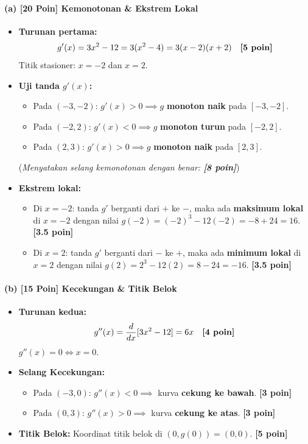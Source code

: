 \documentclass[11pt,a4paper]{article}
\begin{document}
\paragraph{(a) [20 Poin] Kemonotonan \& Ekstrem Lokal}
\begin{itemize}[leftmargin=18pt]
    \item \textbf{Turunan pertama:}
    \[
    g'(x) = 3x^2 - 12 = 3(x^2 - 4) = 3(x-2)(x+2) \quad \text{\textbf{[5 poin]}}
    \]
    Titik stasioner: $x = -2$ dan $x = 2$.
    \item \textbf{Uji tanda $g'(x)$:}
    \begin{itemize}
        \item Pada $(-3, -2)$: $g'(x) > 0 \implies g$ \textbf{monoton naik} pada $[-3, -2]$.
        \item Pada $(-2, 2)$: $g'(x) < 0 \implies g$ \textbf{monoton turun} pada $[-2, 2]$.
        \item Pada $(2, 3)$: $g'(x) > 0 \implies g$ \textbf{monoton naik} pada $[2, 3]$.
    \end{itemize}
    (\textit{Menyatakan selang kemonotonan dengan benar: \textbf{[8 poin]}})
    \item \textbf{Ekstrem lokal:}
    \begin{itemize}
        \item Di $x = -2$: tanda $g'$ berganti dari $+$ ke $-$, maka ada \textbf{maksimum lokal} di $x = -2$ dengan nilai $g(-2) = (-2)^3 - 12(-2) = -8 + 24 = 16$. \textbf{[3.5 poin]}
        \item Di $x = 2$: tanda $g'$ berganti dari $-$ ke $+$, maka ada \textbf{minimum lokal} di $x = 2$ dengan nilai $g(2) = 2^3 - 12(2) = 8 - 24 = -16$. \textbf{[3.5 poin]}
    \end{itemize}
\end{itemize}

\paragraph{(b) [15 Poin] Kecekungan \& Titik Belok}
\begin{itemize}[leftmargin=18pt]
    \item \textbf{Turunan kedua:}
    \[
    g''(x) = \frac{d}{dx}[3x^2 - 12] = 6x \quad \text{\textbf{[4 poin]}}
    \]
    $g''(x) = 0 \iff x = 0$.
    \item \textbf{Selang Kecekungan:}
    \begin{itemize}
        \item Pada $(-3, 0)$: $g''(x) < 0 \implies$ kurva \textbf{cekung ke bawah}. \textbf{[3 poin]}
        \item Pada $(0, 3)$: $g''(x) > 0 \implies$ kurva \textbf{cekung ke atas}. \textbf{[3 poin]}
    \end{itemize}
    \item \textbf{Titik Belok:}
    Koordinat titik belok di $(0, g(0)) = (0, 0)$. \textbf{[5 poin]}
\end{itemize}
\end{document}

